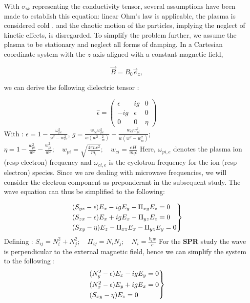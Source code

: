 \documentclass[11pt,openany]{report}
\begin{document}
\begin{multicols}{2}
    With $\sigma_{ik}$ representing the conductivity tensor, several assumptions have been made to establish this equation: linear Ohm's law is applicable, the plasma is considered cold \cite{Krutkin_thesis}, and the chaotic motion of the particles, implying the neglect of kinetic effects, is disregarded. To simplify the problem further, we assume the plasma to be stationary and neglect all forms of damping. In a Cartesian coordinate system with the $z$ axis aligned with a constant magnetic field,

    $$\vec{B} = B_0 \vec{e}_z,$$

    we can derive the following dielectric tensor \cite{Thomas H. Stix}:

    $$
        \hat{\epsilon} = \begin{pmatrix}
            \epsilon & ig       & 0    \\
            -ig      & \epsilon & 0    \\
            0        & 0        & \eta
        \end{pmatrix}
    $$
    With : $\epsilon = 1 - \frac{\omega_{pe}^2}{\omega^2 - w_{ce}^2}$, $g = \frac{w_{ce}w_{pe}^2}{w(w^2 - _{ce}^2)} - \frac{w_{ci}w_{pi}^2}{w(w^2 - w_{ci}^2)}$;
    $ \eta  = 1 - \frac{w_{pe}^2}{w^2} -  \frac{w_{pi}^2}{w^2}; \quad w_{pi} = \sqrt{\frac{4\pi n e^2}{m_i}}; \quad w_{ci} = \frac{eH}{m_i c}$
    Here, $\omega_{pi,e}$ denotes the plasma ion (resp electron) frequency and $\omega_{ci,e}$ is the cyclotron frequency for the ion (resp electron) species. Since we are dealing with microwave frequencies, we will consider the electron component as preponderant in the subsequent study. The wave equation can thus be simplified to the following:

    \begin{equation}
        \begin{rcases}
            (S_{yz} - \epsilon)E_x - igE_y - \Pi_{xy}E_z = 0 \\
            (S_{zx} - \epsilon)E_x + igE_x - \Pi_{yz}E_z = 0 \\
            (S_{xy} - \eta)E_z -\Pi_{xz}E_x - \Pi_{yz}E_y = 0
        \end{rcases}
    \end{equation}
    Defining : $S_{ij} = N_i^2 + N_j^2; \quad \Pi_{ij} = N_iN_j ; \quad N_{i} = \frac{k_iw}{c}$
    For the \textbf{SPR} study the wave is perpendicular to the external magnetic field, hence we can simplify the system to the following :
    \begin{equation}
        \begin{rcases}
            (N_y^2 - \epsilon)E_x - igE_y = 0 \\
            (N_x^2 - \epsilon)E_y + igE_x = 0 \\
            (S_{xy} - \eta)E_z = 0
        \end{rcases}
    \end{equation}


\end{multicols}
\end{document}
